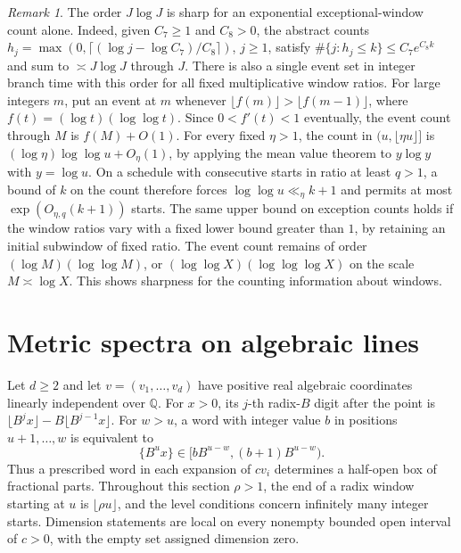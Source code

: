 \documentclass[11pt,reqno,a4paper]{amsart}
\theoremstyle{remark}
\newtheorem{remark}[theorem]{Remark}
\begin{document}
\begin{remark}
The order \(J\log J\) is sharp for an exponential exceptional-window
count alone. Indeed, given \(C_7\ge1\) and \(C_8>0\), the abstract
counts \(h_j=\max(0,\lceil(\log j-\log C_7)/C_8\rceil)\),
\(j\ge1\), satisfy \(\#\{j:h_j\le k\}\le C_7 e^{C_8 k}\)
and sum to \(\asymp J\log J\) through \(J\).
There is also a single event set in integer branch time with
this order for all fixed multiplicative window ratios. For large
integers \(m\), put an event at \(m\) whenever
\(\lfloor f(m)\rfloor>\lfloor f(m-1)\rfloor\), where
\(f(t)=(\log t)(\log\log t)\). Since \(0<f'(t)<1\) eventually,
the event count through \(M\) is \(f(M)+O(1)\).
For every fixed \(\eta>1\), the count in
\((u,\lfloor\eta u\rfloor]\) is
\((\log\eta)\log\log u+O_\eta(1)\), by applying the mean value
theorem to \(y\log y\) with \(y=\log u\).
On a schedule with consecutive starts in ratio at least
\(q>1\), a bound of \(k\) on the count therefore forces
\(\log\log u\ll_\eta k+1\) and permits at most
\(\exp(O_{\eta,q}(k+1))\) starts. The same upper bound on
exception counts holds if the window ratios vary with a fixed
lower bound greater than \(1\), by retaining an initial subwindow
of fixed ratio. The event count remains of order
\((\log M)(\log\log M)\), or \((\log\log X)(\log\log\log X)\)
on the scale \(M\asymp\log X\). This shows sharpness for the
counting information about windows.
\end{remark}

\section{Metric spectra on algebraic lines}\label{sec:metric}

Let \(d\geq2\) and let \(v=(v_1,\ldots,v_d)\) have positive real algebraic
coordinates linearly independent over \(\mathbb Q\). For \(x>0\), its
\(j\)-th radix-\(B\) digit after the point is
\(\lfloor B^jx\rfloor-B\lfloor B^{j-1}x\rfloor\). For \(w>u\), a word with
integer value \(b\) in positions \(u+1,\ldots,w\) is equivalent to
\[
 \{B^ux\}\in[bB^{u-w},(b+1)B^{u-w}).
\]
Thus a prescribed word in each expansion of \(cv_i\) determines a
half-open box of fractional parts. Throughout this section \(\rho>1\),
the end of a radix window starting at \(u\) is \(\lfloor\rho u\rfloor\),
and the level conditions concern infinitely many integer starts.
Dimension statements are local on every nonempty bounded open interval
of \(c>0\), with the empty set assigned dimension zero.
\end{document}
